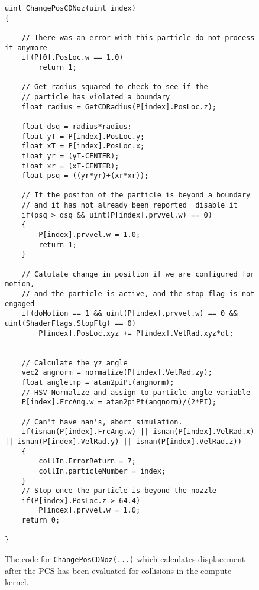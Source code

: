 
\begin{figure}[h]
\centering
\lstset{style=gpucode,linewidth=6.5in,xleftmargin=0.25in}

\begin{lstlisting}
uint ChangePosCDNoz(uint index)	
{		
	
	// There was an error with this particle do not process it anymore
	if(P[0].PosLoc.w == 1.0)
		return 1;

	// Get radius squared to check to see if the
	// particle has violated a boundary
	float radius = GetCDRadius(P[index].PosLoc.z);
	
	float dsq = radius*radius;
	float yT = P[index].PosLoc.y;
	float xT = P[index].PosLoc.x;
	float yr = (yT-CENTER);
	float xr = (xT-CENTER);
	float psq = ((yr*yr)+(xr*xr));	
	
	// If the positon of the particle is beyond a boundary
	// and it has not already been reported  disable it
	if(psq > dsq && uint(P[index].prvvel.w) == 0)
	{
		P[index].prvvel.w = 1.0;
		return 1;
	}
	
	// Calulate change in position if we are configured for motion,
	// and the particle is active, and the stop flag is not engaged
	if(doMotion == 1 && uint(P[index].prvvel.w) == 0 && uint(ShaderFlags.StopFlg) == 0)
		P[index].PosLoc.xyz += P[index].VelRad.xyz*dt;
	
	
	// Calculate the yz angle
	vec2 angnorm = normalize(P[index].VelRad.zy);			
	float angletmp = atan2piPt(angnorm); 
	// HSV Normalize and assign to particle angle variable
	P[index].FrcAng.w = atan2piPt(angnorm)/(2*PI);

	// Can't have nan's, abort simulation.
	if(isnan(P[index].FrcAng.w) || isnan(P[index].VelRad.x) || isnan(P[index].VelRad.y) || isnan(P[index].VelRad.z))
	{
		collIn.ErrorReturn = 7;
		collIn.particleNumber = index;
	}
	// Stop once the particle is beyond the nozzle
	if(P[index].PosLoc.z > 64.4)
		P[index].prvvel.w = 1.0;
	return 0;
	
}	 
\end{lstlisting}


\caption[Benchset test configuration file]{The code for \texttt{ChangePosCDNoz(...)} which calculates displacement after the PCS has been evaluated for collisions in the compute kernel. }
\label{fig:ChangePosCDNoz}
\end{figure}
